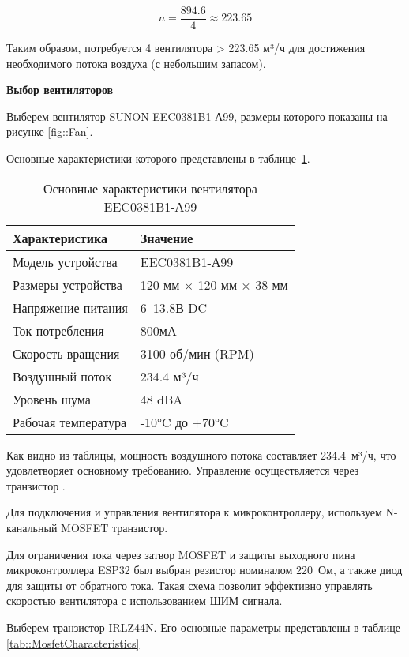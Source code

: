 \[
 n = \frac{894.6}{4} \approx 223.65
\]

Таким образом, потребуется 4 вентилятора > 223.65 м³/ч для достижения необходимого потока воздуха (с небольшим запасом).

\textbf{Выбор вентиляторов}

Выберем вентилятор SUNON EEC0381B1-А99, размеры которого показаны на рисунке \ref{fig::Fan}.


Основные характеристики которого представлены в таблице~\ref{tab::FanCharacteristics}.

\begin{table}[h!]
	\centering
	\caption{Основные характеристики вентилятора EEC0381B1-А99}
	\begin{tabular}{| m{7cm} | m{7cm} |}
		\hline
		\textbf{Характеристика} & \textbf{Значение} \\ \hline
			Модель устройства & EEC0381B1-А99 \\ \hline
			Размеры устройства & 120 мм × 120 мм × 38 мм \\ \hline
			Напряжение питания & 6~13.8В DC \\ \hline
			Ток потребления & 800мА \\ \hline
			Скорость вращения & 3100 об/мин (RPM) \\ \hline
			Воздушный поток & 234.4 м³/ч \\ \hline
			Уровень шума & 48 dBA \\ \hline
			Рабочая температура & -10°C до +70°C \\ \hline
	\end{tabular}
	\label{tab::FanCharacteristics}
\end{table}

Как видно из таблицы, мощность воздушного потока составляет 234.4~м³/ч, что удовлетворяет основному требованию. Управление осуществляется через транзистор . 

Для подключения и управления вентилятора к микроконтроллеру, используем N-канальный MOSFET транзистор.

Для ограничения тока через затвор MOSFET и защиты выходного пина микроконтроллера ESP32 был выбран резистор номиналом 220~Ом, а также диод для защиты от обратного тока. Такая схема позволит эффективно управлять скоростью вентилятора с использованием ШИМ сигнала.

Выберем транзистор IRLZ44N. Его основные параметры представлены в таблице \ref{tab::MosfetCharacteristics}

